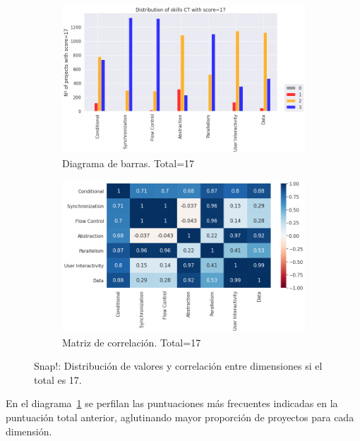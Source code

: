 \documentclass[a4paper, 12pt]{book}
\begin{document}
\begin{figure}
    \centering
    \begin{subfigure}[h]{.49\textwidth} 
        \includegraphics[width=\textwidth]{img/distribucion_17_Snap}
        \caption{Diagrama de barras. Total=17}
        \label{fig:total17_Snap}
    \end{subfigure}       
    \begin{subfigure}[h]{.49\textwidth} 
        \includegraphics[width=\textwidth]{img/corr_17_Snap}
        \caption{Matriz de correlación. Total=17}
        \label{fig:corr17_Snap}
    \end{subfigure}
    \caption{Snap!: Distribución de valores y correlación entre dimensiones si el total es 17.}
\end{figure}

En el diagrama~\ref{fig:total17_Snap} se perfilan las puntuaciones más frecuentes indicadas en la puntuación total anterior, aglutinando mayor proporción de proyectos para cada dimensión.
\end{document}
